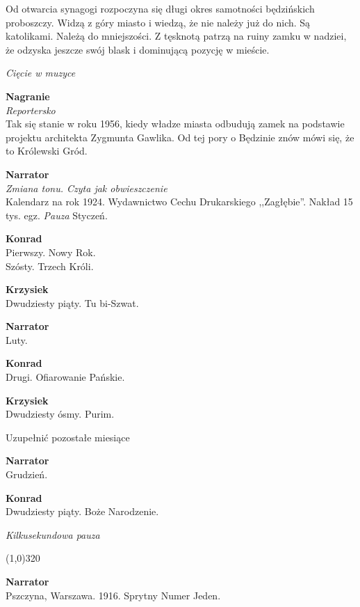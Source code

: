 \documentclass[11pt,a4paper,oneside]{article}
\begin{document}
Od otwarcia synagogi rozpoczyna się długi okres samotności będzińskich
proboszczy. Widzą z góry miasto i wiedzą, że nie należy już do nich.
Są katolikami. Należą do mniejszości. Z tęsknotą patrzą na ruiny zamku w nadziei,
że odzyska jeszcze swój blask i dominującą pozycję w mieście. 

{\color{light-gray} \emph{Cięcie w muzyce}}

\textbf{Nagranie}\\
{\color{light-gray} \emph{Reportersko}}\\
Tak się stanie w roku 1956, kiedy władze miasta odbudują zamek na podstawie
projektu architekta Zygmunta Gawlika. Od tej pory o Będzinie znów mówi się,
że to Królewski Gród.

\textbf{Narrator}\\
{\color{light-gray} \emph{Zmiana tonu. Czyta jak obwieszczenie}}\\
Kalendarz na rok 1924. Wydawnictwo Cechu Drukarskiego
,,Zagłębie''. Nakład 15 tys. egz. {\color{light-gray} \emph{Pauza}} Styczeń.

{\color{konrad}
\textbf{Konrad}\\
Pierwszy. Nowy Rok. \\
Szósty. Trzech Króli.
}

{\color{krzysiek}
\textbf{Krzysiek}\\
Dwudziesty piąty. Tu bi-Szwat. %
}

\textbf{Narrator}\\
Luty.

{\color{konrad}
\textbf{Konrad}\\
Drugi. Ofiarowanie Pańskie.
}

{\color{krzysiek}
\textbf{Krzysiek}\\
Dwudziesty ósmy. Purim.
}

{\color{red} Uzupełnić pozostałe miesiące}

\textbf{Narrator}\\
Grudzień.

{\color{konrad}
\textbf{Konrad}\\
Dwudziesty piąty. Boże Narodzenie.
}

{\color{light-gray} \emph{Kilkusekundowa pauza}}

\line(1,0){320}

\textbf{Narrator}\\
Pszczyna, Warszawa. 1916. Sprytny Numer Jeden. 
\end{document}
